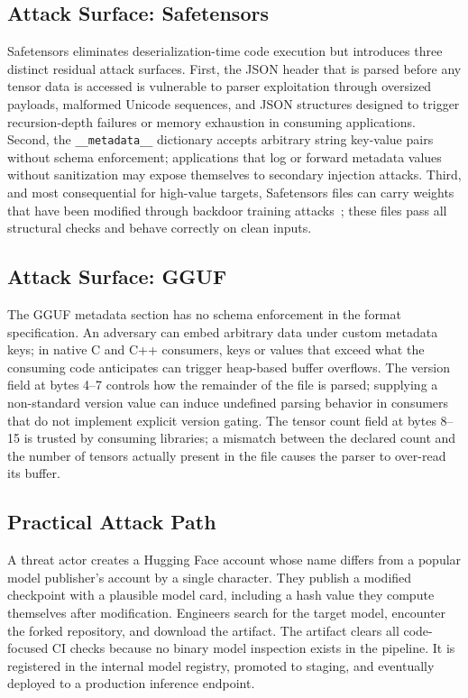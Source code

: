 \documentclass[preprint,12pt,twocolumn]{elsarticle}
\begin{document}
\subsection{Attack Surface: Safetensors}

Safetensors eliminates deserialization-time code execution but introduces
three distinct residual attack surfaces. First, the JSON header that is
parsed before any tensor data is accessed is vulnerable to parser
exploitation through oversized payloads, malformed Unicode sequences, and
JSON structures designed to trigger recursion-depth failures or memory
exhaustion in consuming applications. Second, the \texttt{\_\_metadata\_\_}
dictionary accepts arbitrary string key-value pairs without schema
enforcement; applications that log or forward metadata values without
sanitization may expose themselves to secondary injection attacks. Third,
and most consequential for high-value targets, Safetensors files can carry
weights that have been modified through backdoor training
attacks~\citep{gu2019badnets}; these files pass all structural checks and
behave correctly on clean inputs.

\subsection{Attack Surface: GGUF}

The GGUF metadata section has no schema enforcement in the format
specification. An adversary can embed arbitrary data under custom metadata
keys; in native C and C++ consumers, keys or values that exceed what the
consuming code anticipates can trigger heap-based buffer overflows. The
version field at bytes 4--7 controls how the remainder of the file is
parsed; supplying a non-standard version value can induce undefined parsing
behavior in consumers that do not implement explicit version gating. The
tensor count field at bytes 8--15 is trusted by consuming libraries; a
mismatch between the declared count and the number of tensors actually
present in the file causes the parser to over-read its buffer.

\subsection{Practical Attack Path}

A threat actor creates a Hugging Face account whose name differs from a
popular model publisher's account by a single character. They publish a
modified checkpoint with a plausible model card, including a hash value
they compute themselves after modification. Engineers search for the target
model, encounter the forked repository, and download the artifact. The
artifact clears all code-focused CI checks because no binary model
inspection exists in the pipeline. It is registered in the internal model
registry, promoted to staging, and eventually deployed to a production
inference endpoint.
\end{document}
